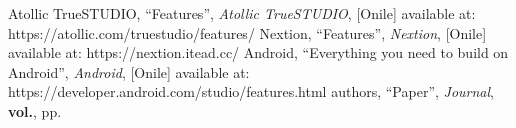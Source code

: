 \begin{thebibliography}{5}
 Atollic TrueSTUDIO, ``Features'', \emph{Atollic TrueSTUDIO}, [Onile] available at: https://atollic.com/truestudio/features/
 Nextion, ``Features'', \emph{Nextion}, [Onile] available at: https://nextion.itead.cc/
 Android, ``Everything you need to build on Android'', \emph{Android}, [Onile] available at: https://developer.android.com/studio/features.html
 authors, ``Paper'', \emph{Journal}, \textbf{vol.}, pp. 
\end{thebibliography}
